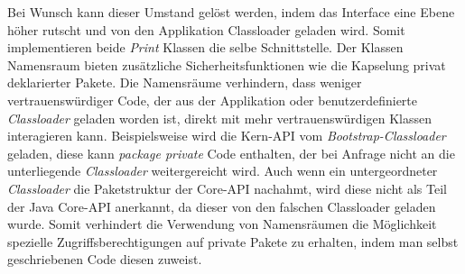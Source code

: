     Bei Wunsch kann dieser Umstand gelöst werden, indem das Interface eine Ebene höher rutscht und von den Applikation Classloader geladen wird. Somit implementieren beide \textit{Print} Klassen die selbe Schnittstelle.   
    \bigbreak Der Klassen Namensraum bieten zusätzliche Sicherheitsfunktionen wie die Kapselung privat deklarierter Pakete. Die Namensräume verhindern, dass weniger vertrauenswürdiger Code, der aus der Applikation oder benutzerdefinierte \textit{Classloader} geladen worden ist, direkt mit mehr vertrauenswürdigen Klassen interagieren kann. Beispielsweise wird die Kern-API vom \textit{Bootstrap-Classloader} geladen, diese kann \textit{package private} Code enthalten, der bei Anfrage nicht an die unterliegende \textit{Classloader} weitergereicht wird. \newline
    Auch wenn ein untergeordneter \textit{Classloader} die Paketstruktur der Core-API nachahmt, wird diese nicht als Teil der Java Core-API anerkannt, da dieser von den falschen Classloader geladen wurde. Somit verhindert die Verwendung von Namensräumen die Möglichkeit spezielle Zugriffsberechtigungen auf private Pakete zu erhalten, indem man selbst geschriebenen Code diesen zuweist.
